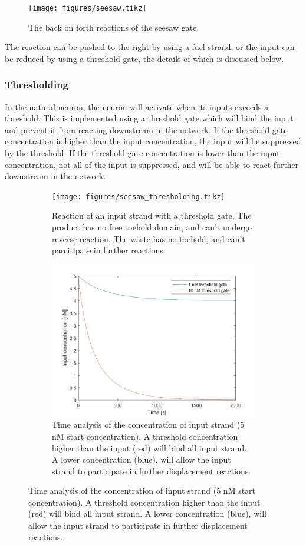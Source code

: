 \begin{figure}[H]
\texttt{[image: figures/seesaw.tikz]}
\caption{The back on forth reactions of the seesaw gate.}
\label{seesaw}
\end{figure}

The reaction can be pushed to the right by using a fuel strand, or the input can be reduced by using a threshold gate, the details of which is discussed below.

\subsubsection{Thresholding}
In the natural neuron, the neuron will activate when its inputs exceeds a threshold. This is implemented using a threshold gate which will bind the input and prevent it from reacting downstream in the network. If the threshold gate concentration is higher than the input concentration, the input will be suppressed by the threshold. If the threshold gate concentration is lower than the input concentration, not all of the input is suppressed, and will be able to react further downstream in the network.

\begin{figure}[H]
  \begin{subfigure}[t]{.49\textwidth}
    \texttt{[image: figures/seesaw\_thresholding.tikz]}
\caption{Reaction of an input strand with a threshold gate. The product has no free toehold domain, and can't undergo reverse reaction. The waste has no toehold, and can't parcitipate in further reactions.}
\label{}
\end{subfigure}
\hfill
\begin{subfigure}[t]{.49\columnwidth}
  \centering
\includegraphics[width=\linewidth]{images/thresholding.png}
\caption{Time analysis of the concentration of input strand (5 nM start concentration). A threshold concentration higher than the input (red) will bind all input strand. A lower concentration (blue), will allow the input strand to participate in further displacement reactions.}
\label{}
\end{subfigure}
\end{figure}

